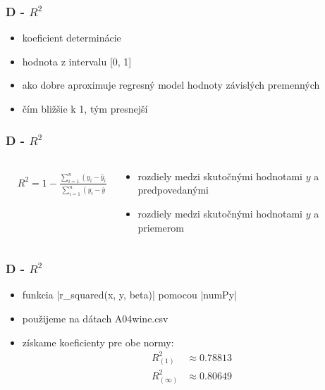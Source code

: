 \documentclass[presentation.tex]{subfiles}
\begin{document}
	
	\begin{frame}
		\frametitle{D - $R^2$ }
		\begin{itemize}
			\item koeficient determinácie
			\item hodnota z intervalu [0, 1]
			\item ako dobre aproximuje regresný model hodnoty závislých premenných
			\item čím bližšie k 1, tým presnejší
		\end{itemize}
		
		
		

	\end{frame}

	\begin{frame}
		\frametitle{D - $R^2$ }
		\begin{columns}
			\begin{column}{0.5\textwidth}
				\centering
				\begin{align*}
						&R^2 = 1 - \frac{\sum_{i=1}^{n} (y_i - \hat{y}_i)^2}{\sum_{i=1}^{n} (y_i - \bar{y})^2}
				\end{align*}
			\end{column}
			\begin{column}{0.5\textwidth}
				\begin{itemize}
					\item rozdiely medzi skutočnými hodnotami $y$ a predpovedanými
					\item  rozdiely medzi skutočnými hodnotami $y$ a priemerom
				\end{itemize}
				
			\end{column}
		\end{columns}
	\end{frame}

	\begin{frame}
		\frametitle{D - $R^2$ }
				\begin{itemize}
					\item funkcia \pyth|r_squared(x, y, beta)| pomocou \pyth|numPy| 
					\item použijeme na dátach A04wine.csv
					\item získame koeficienty pre obe normy: \begin{align*} R^{2}_{(1)} &\approx  0.78813\\
															     R^{2}_{(\infty)} &\approx 0.80649
													\end{align*}
				\end{itemize}
			
	\end{frame}
	
\end{document}

